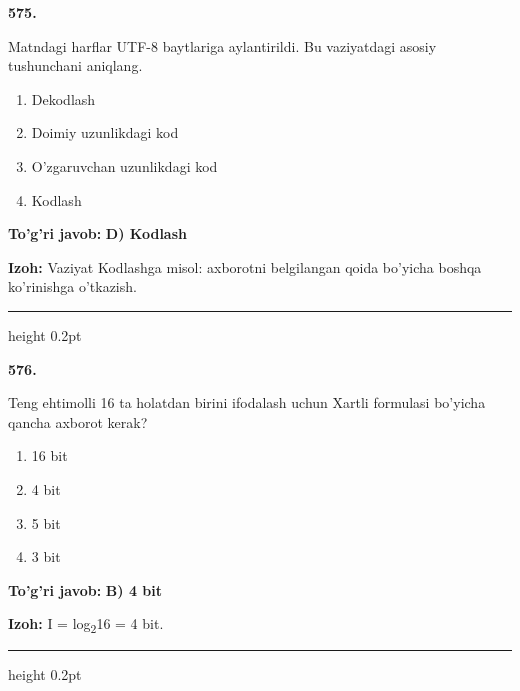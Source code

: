 \documentclass[10pt,a4paper,oneside]{article}
\begin{document}
\noindent\textbf{\color{ink}575.}
\par
Matndagi harflar UTF-8 baytlariga aylantirildi. Bu vaziyatdagi asosiy tushunchani aniqlang.
\begin{enumerate}[label=\Alph*),leftmargin=9mm]
\item Dekodlash
\item Doimiy uzunlikdagi kod
\item O'zgaruvchan uzunlikdagi kod
\item Kodlash
\end{enumerate}
\begin{tcolorbox}[enhanced,breakable,colback=teal!4,colframe=teal!50!black,boxrule=0.5pt,arc=1.1mm,left=3mm,right=3mm,top=1.7mm,bottom=1.7mm,before skip=2mm,after skip=2mm]
\textbf{\color{teal}To'g'ri javob:} \textbf{D) Kodlash}
\par\smallskip
\textbf{Izoh:} Vaziyat Kodlashga misol: axborotni belgilangan qoida bo'yicha boshqa ko'rinishga o'tkazish.
\end{tcolorbox}
\vspace{2mm}\hrule height 0.2pt \vspace{3mm}

\noindent\textbf{\color{ink}576.}
\par
Teng ehtimolli 16 ta holatdan birini ifodalash uchun Xartli formulasi bo'yicha qancha axborot kerak?
\begin{enumerate}[label=\Alph*),leftmargin=9mm]
\item 16 bit
\item 4 bit
\item 5 bit
\item 3 bit
\end{enumerate}
\begin{tcolorbox}[enhanced,breakable,colback=teal!4,colframe=teal!50!black,boxrule=0.5pt,arc=1.1mm,left=3mm,right=3mm,top=1.7mm,bottom=1.7mm,before skip=2mm,after skip=2mm]
\textbf{\color{teal}To'g'ri javob:} \textbf{B) 4 bit}
\par\smallskip
\textbf{Izoh:} I = log\textsubscript{2}16 = 4 bit.
\end{tcolorbox}
\vspace{2mm}\hrule height 0.2pt \vspace{3mm}
\end{document}
